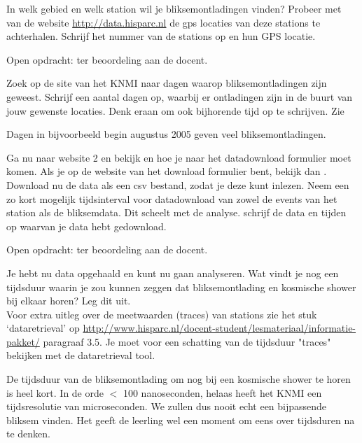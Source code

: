 \begin{questions}
\question 
In welk gebied en welk station wil je bliksemontladingen vinden? Probeer met 
van de website \url{http://data.hisparc.nl} de gps locaties van deze stations te 
achterhalen. Schrijf het nummer van de stations op en hun GPS locatie.
\begin{solution}
  Open opdracht: ter beoordeling aan de docent.
\end{solution}

\question 
Zoek op de site van het KNMI naar dagen waarop bliksemontladingen zijn geweest.
Schrijf een aantal dagen op, waarbij er ontladingen zijn in de buurt van jouw gewenste
locaties. Denk eraan om ook bijhorende tijd op te schrijven. Zie 
\begin{solution}
   Dagen in bijvoorbeeld begin augustus 2005 geven veel bliksemontladingen.
\end{solution}

\question 
Ga nu naar website 2 en bekijk  en 
hoe je naar het datadownload formulier moet komen. 
Als je op de website van het download formulier bent, bekijk dan .
Download nu de data als een csv bestand, zodat je deze kunt inlezen. Neem een zo kort mogelijk tijdsinterval
voor datadownload van zowel de events van het \hisparc station als de bliksemdata.
Dit scheelt met de analyse. schrijf de data en tijden op waarvan je data hebt gedownload.
\begin{solution}
  Open opdracht: ter beoordeling aan de docent.
\end{solution}

\question 
Je hebt nu data opgehaald en kunt nu gaan analyseren.
Wat vindt je nog een tijdsduur waarin je zou kunnen zeggen dat bliksemontlading
en kosmische shower bij elkaar horen? Leg dit uit. \\
\small{Voor extra uitleg over de meetwaarden (traces) van \hisparc stations zie het stuk `dataretrieval' 
op \url{ http://www.hisparc.nl/docent-student/lesmateriaal/informatie-pakket/} paragraaf 3.5.
Je moet voor een schatting van de tijdsduur "traces" bekijken met de dataretrieval tool.}
\begin{solution}
  De tijdsduur van de bliksemontlading om nog bij een kosmische shower te horen 
  is heel kort. In de orde $<$ 100 nanoseconden, helaas heeft het KNMI een tijdsresolutie
  van microseconden. We zullen dus nooit echt een bijpassende bliksem vinden.
  Het geeft de leerling wel een moment om eens over tijdsduren na te denken.
\end{solution}


\end{questions}
